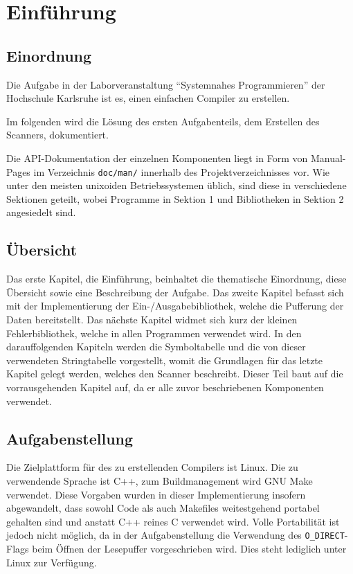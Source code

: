 \chapter{Einführung}
\label{chap:intro}

\section{Einordnung}
\label{sec:category}
Die Aufgabe in der Laborveranstaltung ``Systemnahes Programmieren'' der
Hochschule Karlsruhe ist es,
einen einfachen Compiler zu erstellen.

Im folgenden wird die Lösung des ersten Aufgabenteils,
dem Erstellen des Scanners,
dokumentiert.

Die API-Dokumentation der einzelnen Komponenten liegt in Form von Manual-Pages
im Verzeichnis \texttt{doc/man/} innerhalb des Projektverzeichnisses vor.
Wie unter den meisten unixoiden Betriebssystemen üblich,
sind diese in verschiedene Sektionen geteilt,
wobei Programme in Sektion 1 und Bibliotheken in Sektion 2 angesiedelt sind.

\section{Übersicht}
\label{sec:overview}
Das erste Kapitel, die Einführung,
beinhaltet die thematische Einordnung,
diese Übersicht sowie eine Beschreibung der Aufgabe.
Das zweite Kapitel befasst sich mit der Implementierung der
Ein-/Ausgabebibliothek,
welche die Pufferung der Daten bereitstellt.
Das nächste Kapitel widmet sich kurz der kleinen Fehlerbibliothek,
welche in allen Programmen verwendet wird.
In den darauffolgenden Kapiteln werden die Symboltabelle und die von dieser
verwendeten Stringtabelle vorgestellt,
womit die Grundlagen für das letzte Kapitel gelegt werden,
welches den Scanner beschreibt.
Dieser Teil baut auf die vorrausgehenden Kapitel auf,
da er alle zuvor beschriebenen Komponenten verwendet.

\section{Aufgabenstellung}
\label{sec:description}
Die Zielplattform für des zu erstellenden Compilers ist Linux.
Die zu verwendende Sprache ist C++,
zum Buildmanagement wird GNU Make verwendet.
Diese Vorgaben wurden in dieser Implementierung insofern abgewandelt,
dass sowohl Code als auch Makefiles weitestgehend portabel gehalten sind
und anstatt C++ reines C verwendet wird.
Volle Portabilität ist jedoch nicht möglich,
da in der Aufgabenstellung die Verwendung des \texttt{O\_DIRECT}-Flags beim
Öffnen der Lesepuffer vorgeschrieben wird.
Dies steht lediglich unter Linux zur Verfügung.

